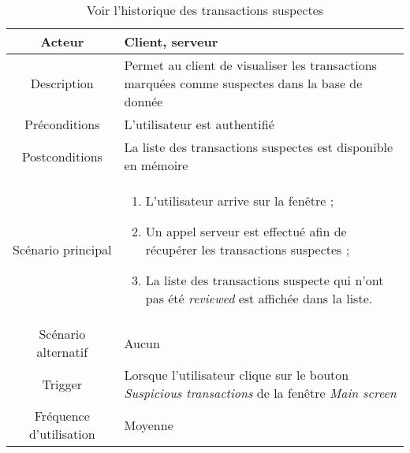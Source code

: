 \documentclass{article}
\begin{document}
\begin{table}

\begin{tabular}{|c|p{11cm}|}
\hline
Acteur & Client, serveur \\
\hline
Description & Permet au client de visualiser les transactions marquées comme suspectes dans la base de donnée \\
\hline
Préconditions & L'utilisateur est authentifié \\
\hline
Postconditions & La liste des transactions suspectes est disponible en mémoire \\
\hline
Scénario principal & \begin{enumerate}
\item L'utilisateur arrive sur la fenêtre ;
\item Un appel serveur est effectué afin de récupérer les transactions suspectes ;
\item La liste des transactions suspecte qui n'ont pas été \emph{reviewed} est affichée dans la liste.
\end{enumerate} \\
\hline
Scénario alternatif & Aucun \\
\hline
Trigger & Lorsque l'utilisateur clique sur le bouton \emph{Suspicious transactions} de la fenêtre \emph{Main screen} \\
\hline
Fréquence d'utilisation & Moyenne \\
\hline
\end{tabular}

\caption{Voir l'historique des transactions suspectes}

\end{table}
\end{document}
